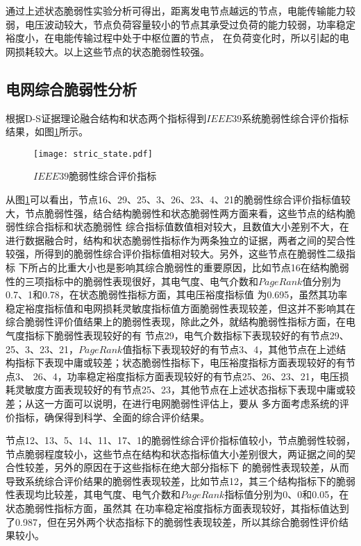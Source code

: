 通过上述状态脆弱性实验分析可得出，距离发电节点越远的节点，电能传输能力较弱，电压波动较大，节点负荷容量较小的节点其承受过负荷的能力较弱，功率稳定裕度小，在电能传输过程中处于中枢位置的节点，
在负荷变化时，所以引起的电网损耗较大。以上这些节点的状态脆弱性较强。

\subsection{电网综合脆弱性分析}
\label{sec:singleAnalysis}
根据D-S证据理论融合结构和状态两个指标得到$IEEE39$系统脆弱性综合评价指标结果，如图\ref{fig:stric_state}所示。
\begin{figure}[H] %
  \centering
  \texttt{[image: stric\_state.pdf]}
  \caption{$IEEE39$脆弱性综合评价指标}
  \label{fig:stric_state}
\end{figure}

从图\ref{fig:stric_state}可以看出，节点16、29、25、3、26、23、4、21的脆弱性综合评价指标值较大，节点脆弱性强，结合结构脆弱性和状态脆弱性两方面来看，这些节点的结构脆弱性综合指标和状态脆弱性
综合指标值数值相对较大，且数值大小差别不大，在进行数据融合时，结构和状态脆弱性指标作为两条独立的证据，两者之间的契合性较强，所得到的脆弱性综合评价指标值相对较大。另外，这些节点在脆弱性二级指标
下所占的比重大小也是影响其综合脆弱性的重要原因，比如节点16在结构脆弱性的三项指标中的脆弱性表现很好，其电气度、电气介数和$PageRank$值分别为0.7、1和0.78，在状态脆弱性指标方面，其电压裕度指标值
为0.695，虽然其功率稳定裕度指标值和电网损耗灵敏度指标值方面脆弱性表现较差，但这并不影响其在综合脆弱性评价值结果上的脆弱性表现，除此之外，就结构脆弱性指标方面，在电气度指标下脆弱性表现较好的有
节点29，电气介数指标下表现较好的有节点29、25、3、23、21，$PageRank$值指标下表现较好的有节点3、4，其他节点在上述结构指标下表现中庸或较差；状态脆弱性指标下，电压裕度指标方面表现较好的有节点3、
26、4，功率稳定裕度指标方面表现较好的有节点25、26、23、21，电压损耗灵敏度方面表现较好的有节点25、23，其他节点在上述状态指标下表现中庸或较差；从这一方面可以说明，在进行电网脆弱性评估上，要从
多方面考虑系统的评价指标，确保得到科学、全面的综合评价结果。

节点12、13、5、14、11、17、1的脆弱性综合评价指标值较小，节点脆弱性较弱，节点脆弱程度较小，这些节点在结构和状态指标值大小差别很大，两证据之间的契合性较差，另外的原因在于这些指标在绝大部分指标下
的脆弱性表现较差，从而导致系统综合评价结果的脆弱性表现较差，比如节点12，其三个结构指标下的脆弱性表现均比较差，其电气度、电气介数和$PageRank$指标值分别为0、0和0.05，在状态脆弱性指标方面，虽然其
在功率稳定裕度指标方面表现较好，其指标值达到了0.987，但在另外两个状态指标下的脆弱性表现较差，所以其综合脆弱性评价结果较小。

